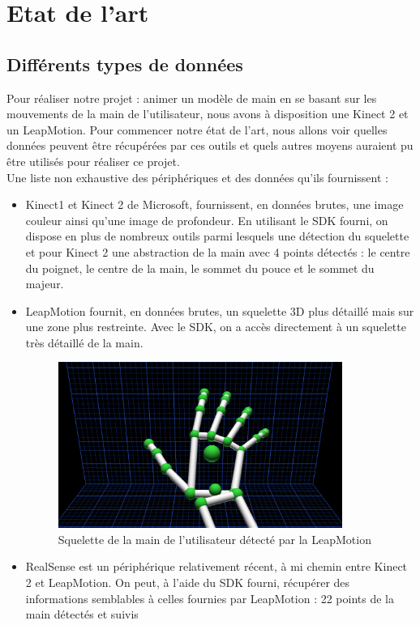 \chapter{Etat de l'art}

\section{Différents types de données}
Pour réaliser notre projet : animer un modèle de main en se basant sur les mouvements de la main de l'utilisateur, nous avons à disposition une 
Kinect 2 et un LeapMotion. Pour commencer notre état de l'art, nous allons voir quelles données peuvent être récupérées par ces outils et 
quels autres moyens auraient pu être utilisés pour réaliser ce projet.\\

Une liste non exhaustive des périphériques et des données qu'ils fournissent : 
\begin{itemize}
  \item Kinect1 et Kinect 2 de Microsoft, fournissent, en données brutes, une image couleur ainsi qu'une image de profondeur. 
En utilisant le SDK fourni, on dispose en plus de nombreux outils parmi lesquels une détection du squelette et pour Kinect 2 
une abstraction de la main avec 4 points détectés : le centre du poignet, le centre de la main, le sommet du pouce et le sommet du majeur. 
  \item LeapMotion fournit, en données brutes, un squelette 3D plus détaillé mais sur une zone 
plus restreinte. Avec le SDK, on a accès directement à un squelette très détaillé de la main.
    \begin{figure}[!h]
    \center
    \includegraphics[width=350px]{images/SDK_LeapMotion.png}
    \caption{Squelette de la main de l'utilisateur détecté par la LeapMotion}
    \end{figure}
  \item RealSense est un périphérique relativement récent, à mi chemin entre Kinect 2 et LeapMotion. On peut, à l'aide du SDK fourni, récupérer des informations semblables à celles fournies par LeapMotion : 
  22 points de la main détectés et suivis
\end{itemize}
\ \\


